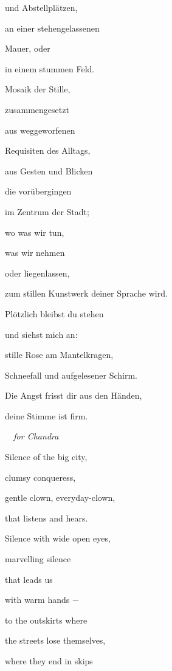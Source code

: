 und Abstellplätzen,


\bigskip

an einer stehengelassenen 

Mauer, oder

in einem stummen Feld.

Mosaik der Stille, 


\bigskip

zusammengesetzt

aus weggeworfenen

Requisiten des Alltags,

aus Gesten und Blicken 


\bigskip

die vorübergingen

im Zentrum der Stadt; 

wo was wir tun,

was wir nehmen


\bigskip

oder liegenlassen,

zum stillen Kunstwerk deiner Sprache wird.

Plötzlich bleibst du stehen

und siehst mich an:


\bigskip

stille Rose am Mantelkragen,

Schneefall und aufgelesener Schirm.

Die Angst frisst dir aus den Händen,

deine Stimme ist firm.


\bigskip


\emph{
\ \ for Chandra}


\bigskip

Silence of the big city,

clumsy conqueress,

gentle clown, everyday-clown,

that listens and hears.


\bigskip

Silence with wide open eyes,

marvelling silence

that leads us

with warm hands $-$


\bigskip

to the outskirts where

the streets lose themselves,

where they end in skips


